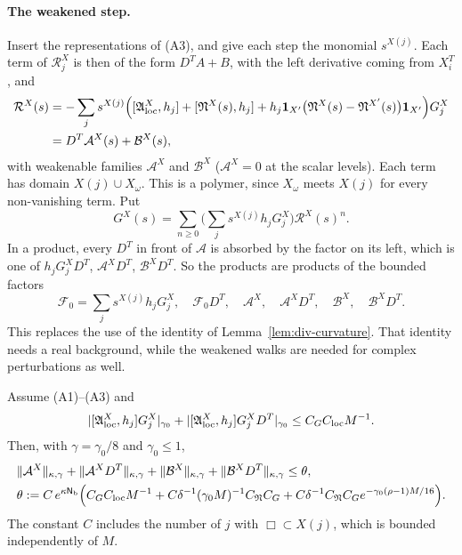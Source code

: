 \paragraph{The weakened step.} Insert the representations of (A3), and give each step the monomial $s^{X(j)}$. Each term of $\mathcal R^X_j$ is then of the form $D^TA+B$, with the left derivative coming from $X_i^T$, and
\[
\begin{aligned}
\mathcal R^X(s)&=-\sum_js^{X(j)}\Big([\mathfrak A^X_{\rm loc},h_j]+[\mathfrak N^X(s),h_j]+h_j\mathbf 1_{X'}\big(\mathfrak N^X(s)-\mathfrak N^{X'}(s)\big)\mathbf 1_{X'}\Big)G^X_j\\
&=D^T\mathcal A^X(s)+\mathcal B^X(s),
\end{aligned}
\]
with weakenable families $\mathcal A^X$ and $\mathcal B^X$ ($\mathcal A^X=0$ at the scalar levels). Each term has domain $X(j)\cup X_\omega$. This is a polymer, since $X_\omega$ meets $X(j)$ for every non-vanishing term. Put
\[
G^X(s)=\sum_{n\ge0}\Big(\sum_js^{X(j)}h_jG^X_j\Big)\mathcal R^X(s)^n .
\]
In a product, every $D^T$ in front of $\mathcal A$ is absorbed by the factor on its left, which is one of $h_jG^X_jD^T$, $\mathcal A^XD^T$, $\mathcal B^XD^T$. So the products are products of the bounded factors
\[
\mathcal F_0=\sum_js^{X(j)}h_jG^X_j,\quad\mathcal F_0D^T,\quad\mathcal A^X,\quad\mathcal A^XD^T,\quad\mathcal B^X,\quad\mathcal B^XD^T .
\]
This replaces the use of the identity of Lemma~\ref{lem:div-curvature}. That identity needs a real background, while the weakened walks are needed for complex perturbations as well.

\begin{lemma}\label{lem:step-small}
Assume (A1)--(A3) and
\[
|[\mathfrak A^X_{\rm loc},h_j]G^X_j|_{\gamma_0}+|[\mathfrak A^X_{\rm loc},h_j]G^X_jD^T|_{\gamma_0}\le C_GC_{\rm loc}M^{-1}.
\]
Then, with $\gamma=\gamma_0/8$ and $\gamma_0\le1$,
\[
\begin{aligned}
&\|\mathcal A^X\|_{\kappa,\gamma}+\|\mathcal A^XD^T\|_{\kappa,\gamma}+\|\mathcal B^X\|_{\kappa,\gamma}+\|\mathcal B^XD^T\|_{\kappa,\gamma}\le\theta,\\
&\theta:=C\,e^{\kappa\mathsf N_{\rm b}}\Big(C_GC_{\rm loc}M^{-1}+C\delta^{-1}(\gamma_0M)^{-1}C_{\mathfrak N}C_G+C\delta^{-1}C_{\mathfrak N}C_Ge^{-\gamma_0(\rho-1)M/16}\Big).
\end{aligned}
\]
The constant $C$ includes the number of $j$ with $\Box\subset X(j)$, which is bounded independently of $M$.
\end{lemma}

